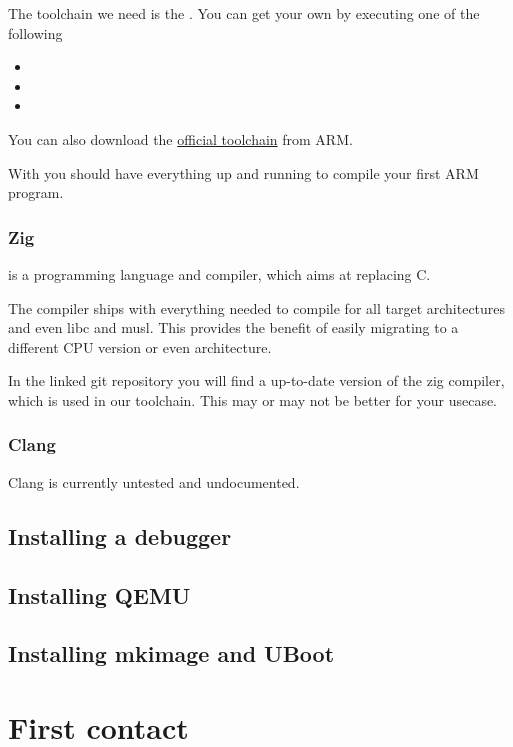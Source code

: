     The toolchain we need is the . You can get your own by executing one of the following
    \begin{itemize}
        \item {}
        \item {}
        \item {}
    \end{itemize}

    You can also download the \href{https://developer.arm.com/tools-and-software/open-source-software/developer-tools/gnu-toolchain/gnu-rm/downloads}{official toolchain} from ARM.

    With  you should have everything up and running to compile your first ARM program.

    \subsubsection{Zig}

    \zig{} is a programming language and compiler, which aims at replacing C\@.

    The \zig{} compiler ships with everything needed to compile for all target architectures and even libc and musl.
    This provides the benefit of easily migrating to a different CPU version or even architecture.

    In the linked git repository you will find a up-to-date version of the zig compiler, which is used in our toolchain.
    This may or may not be better for your usecase.


    \subsubsection{Clang}

    Clang is currently untested and undocumented.

    \subsection{Installing a debugger}

    \subsection{Installing QEMU}

    \subsection{Installing mkimage and UBoot}


    
    \section{First contact}
    





